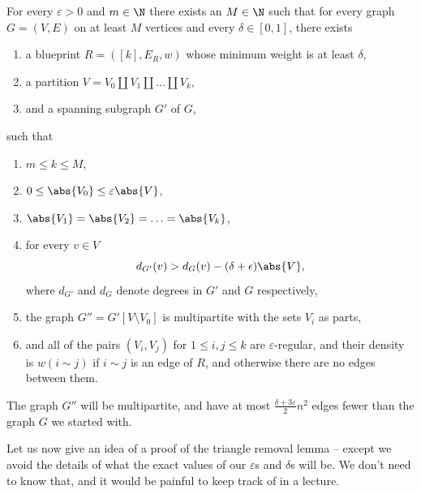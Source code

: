 \documentclass[nobib]{tufte-handout}
\begin{document}
\begin{theorem}
    For every $\varepsilon > 0$ and $m \in \N$ there exists an $M \in \N$ such that for every graph $G = (V,E)$ on at least $M$ vertices and every $\delta \in [0,1]$, there exists
    \begin{enumerate}[label=\alph*)]
      \item a blueprint $R = ([k],E_R,w)$ whose minimum weight is at least $\delta$,
      \item a partition $V = V_0 \coprod V_1 \coprod \ldots \coprod V_k$,
      \item and a spanning subgraph $G'$ of $G$,
    \end{enumerate}
    such that
    \begin{enumerate}
      \item $m \leq k \leq M$,
      \item $0 \leq \abs{V_0} \leq \varepsilon\abs{V}$,
      \item $\abs{V_1} = \abs{V_2} = \ldots = \abs{V_k}$,
      \item for every $v \in V$
      $$d_{G'}(v) > d_G(v) - (\delta + \epsilon)\abs{V},$$
      where $d_{G'}$ and $d_G$ denote degrees in $G'$ and $G$ respectively,
      \item the graph $G'' = G'[V\setminus V_0]$ is multipartite with the sets $V_i$ as parts,
      \item and all of the pairs $(V_i, V_j)$ for $1 \leq i, j \leq k$ are $\varepsilon$-regular, and their density is $w(i \sim j)$ if $i \sim j$ is an edge of $R$, and otherwise there are no edges between them. 
    \end{enumerate}
\end{theorem}

\begin{remark}
    The graph $G''$ will be multipartite, and have at most $\frac{\delta + 3\varepsilon}{2}n^2$ edges fewer than the graph $G$ we started with.
\end{remark}

Let us now give an idea of a proof of the triangle removal lemma -- except we avoid the details of what the exact values of our $\varepsilon$s and $\delta$s will be. We don't need to know that, and it would be painful to keep track of in a lecture.
\end{document}
